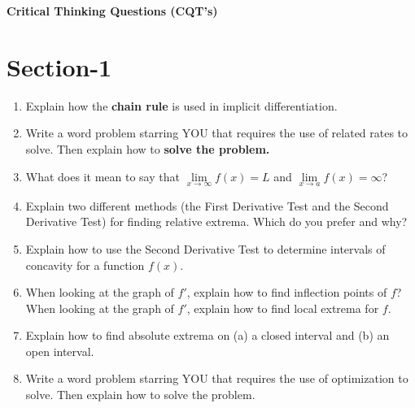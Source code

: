 \documentclass[11pt]{article}
\begin{document}
\textbf{Critical Thinking Questions (CQT's)}

\section{Section-1}


\begin{enumerate}
\setlength\itemsep{1em}
\item Explain how the \textbf{chain rule} is used in implicit differentiation.
\item Write a word problem starring YOU that requires the use of related rates to solve. Then explain how to \textbf{solve the problem.} 
\item What does it mean to say that $\lim\limits_{x \to \infty}f(x)=L$ and $\lim\limits_{x \to a}f(x)=\infty$?
\item Explain two different methods (the First Derivative Test and the Second Derivative Test) for finding relative extrema. Which do you prefer and why?
\item Explain how to use the Second Derivative Test to determine intervals of concavity for a function $f(x)$.
\item When looking at the graph of $f'$, explain how to find inflection points of $f$? When looking at the graph of $f'$, explain how to find local extrema for $f$.
\item Explain how to find absolute extrema on (a) a closed interval and (b) an open interval.
\item Write a word problem starring YOU that requires the use of optimization to solve. Then explain how to solve the problem.
\end{enumerate}
\end{document}
